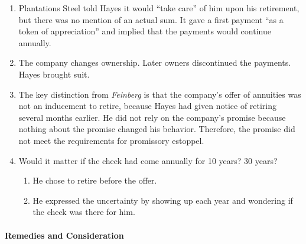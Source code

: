 \begin{enumerate}
    \item Plantations Steel told Hayes it would ``take care'' of him upon his 
    retirement, but there was no mention of an actual sum. It gave a first 
    payment ``as a token of appreciation'' and implied that the payments would 
    continue annually.
    \item The company changes ownership. Later owners discontinued the 
    payments. Hayes brought suit.
    \item The key distinction from \emph{Feinberg} is that the company's offer 
    of annuities was not an inducement to retire, because Hayes had given 
    notice of retiring several months earlier. He did not rely on the 
    company's promise because nothing about the promise changed his behavior. 
    Therefore, the promise did not meet the requirements for promissory 
    estoppel.
    \item Would it matter if the check had come annually for 10 years? 30 
    years?
    \begin{enumerate}
        \item He chose to retire before the offer.
        \item He expressed the uncertainty by showing up each year and 
        wondering if the check was there for him.
    \end{enumerate}
\end{enumerate}

\paragraph{Remedies and Consideration}

